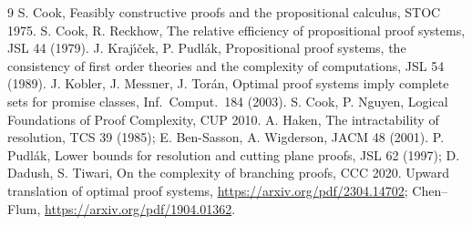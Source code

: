 \documentclass[11pt]{article}
\theoremstyle{remark}
\begin{document}
\begin{thebibliography}{9}\small
\bibitem{} S. Cook, Feasibly constructive proofs and the propositional calculus, STOC 1975.
\bibitem{} S. Cook, R. Reckhow, The relative efficiency of propositional proof systems, JSL 44 (1979).
\bibitem{} J. Kraj\'\i\v{c}ek, P. Pudl\'ak, Propositional proof systems, the consistency of first order theories and the complexity of computations, JSL 54 (1989).
\bibitem{} J. Kobler, J. Messner, J. Tor\'an, Optimal proof systems imply complete sets for promise classes, Inf.\ Comput.\ 184 (2003).
\bibitem{} S. Cook, P. Nguyen, Logical Foundations of Proof Complexity, CUP 2010.
\bibitem{} A. Haken, The intractability of resolution, TCS 39 (1985); E. Ben-Sasson, A. Wigderson, JACM 48 (2001).
\bibitem{} P. Pudl\'ak, Lower bounds for resolution and cutting plane proofs, JSL 62 (1997); D. Dadush, S. Tiwari, On the complexity of branching proofs, CCC 2020.
\bibitem{} Upward translation of optimal proof systems, \url{https://arxiv.org/pdf/2304.14702}; Chen--Flum, \url{https://arxiv.org/pdf/1904.01362}.
\end{thebibliography}
\end{document}
